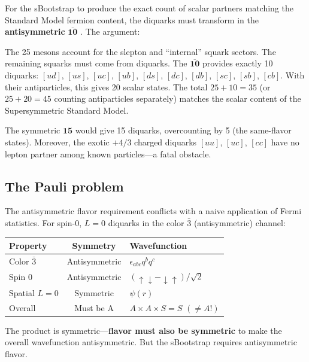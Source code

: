 \documentclass[12pt,a4paper]{article}
\begin{document}
For the sBootstrap to produce the exact count of scalar partners 
matching the Standard Model fermion content, the diquarks must 
transform in the \textbf{antisymmetric} $\overline{\mathbf{10}}$ 
\cite{Rivero2005}. The argument:

The 25 mesons account for the slepton and ``internal'' squark 
sectors. The remaining squarks must come from diquarks. The 
$\overline{\mathbf{10}}$ provides exactly 10 diquarks: $[ud]$, 
$[us]$, $[uc]$, $[ub]$, $[ds]$, $[dc]$, $[db]$, $[sc]$, $[sb]$, 
$[cb]$. With their antiparticles, this gives 20 scalar states. The 
total $25 + 10 = 35$ (or $25 + 20 = 45$ counting antiparticles 
separately) matches the scalar content of the Supersymmetric 
Standard Model.

The symmetric $\mathbf{15}$ would give 15 diquarks, overcounting 
by 5 (the same-flavor states). Moreover, the exotic $+4/3$ charged 
diquarks $[uu]$, $[uc]$, $[cc]$ have no lepton partner among known 
particles---a fatal obstacle.

\subsection{The Pauli problem}

The antisymmetric flavor requirement conflicts with a naive 
application of Fermi statistics. For spin-0, $L=0$ diquarks in 
the color $\bar{3}$ (antisymmetric) channel:

\begin{center}
\begin{tabular}{lcl}
\toprule
Property & Symmetry & Wavefunction \\
\midrule
Color $\bar{3}$ & Antisymmetric & $\epsilon_{abc} q^b q^c$ \\
Spin 0 & Antisymmetric & $(\uparrow\downarrow - \downarrow\uparrow)/\sqrt{2}$ \\
Spatial $L=0$ & Symmetric & $\psi(r)$ \\
\midrule
Overall & Must be A & $A \times A \times S = S$ \quad$(\neq A!)$ \\
\bottomrule
\end{tabular}
\end{center}

The product is symmetric---\textbf{flavor must also be symmetric} 
to make the overall wavefunction antisymmetric. But the sBootstrap 
requires antisymmetric flavor.
\end{document}
